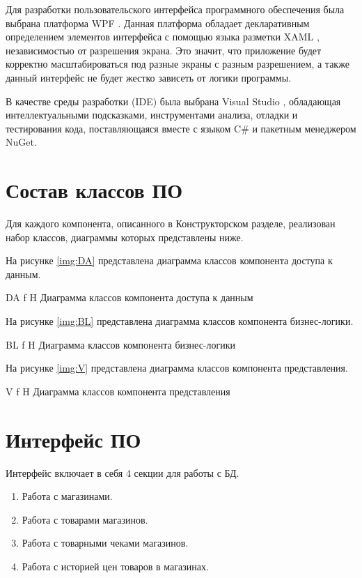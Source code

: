\documentclass{bmstu}
\begin{document}
Для разработки пользовательского интерфейса программного обеспечения была выбрана платформа WPF \cite{wpf}. Данная платформа обладает декларативным определением элементов интерфейса с помощью языка разметки XAML \cite{xaml}, независимостью от разрешения экрана. Это значит, что приложение будет корректно масштабироваться под разные экраны с разным разрешением, а также данный интерфейс не будет жестко зависеть от логики программы.

В качестве среды разработки (IDE) была выбрана Visual Studio \cite{vs}, обладающая интеллектуальными подсказками, инструментами анализа, отладки и тестирования кода, поставляющаяся вместе с языком C\# и пакетным менеджером NuGet.

\section{Состав классов ПО}

Для каждого компонента, описанного в Конструкторском разделе, реализован набор классов, диаграммы которых представлены ниже.

На рисунке \ref{img:DA} представлена диаграмма классов компонента доступа к данным.

	{DA}
	{f}
	{H}
	{\textwidth}
	{Диаграмма классов компонента доступа к данным}
	
На рисунке \ref{img:BL} представлена диаграмма классов компонента бизнес-логики.

{BL}
{f}
{H}
{\textwidth}
{Диаграмма классов компонента бизнес-логики}

На рисунке \ref{img:V} представлена диаграмма классов компонента представления.

{V}
{f}
{H}
{\textwidth}
{Диаграмма классов компонента представления}	

\section{Интерфейс ПО}

Интерфейс включает в себя 4 секции для работы с БД.

\begin{enumerate}
	\item Работа с магазинами.
	\item Работа с товарами магазинов.
	\item Работа с товарными чеками магазинов.
	\item Работа с историей цен товаров в магазинах.
\end{enumerate}
\end{document}
